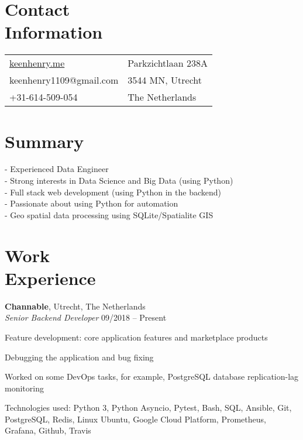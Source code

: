 \documentclass[margin,line]{resume}
\begin{document}
\begin{resume}

    \section{\myheadingstyle Contact \\ Information}
      \begin{tabular}{@{}p{7cm}p{6cm}}
      \url{keenhenry.me}      & Parkzichtlaan 238A \\
      keenhenry1109@gmail.com & 3544 MN, Utrecht \\
      +31-614-509-054        & The Netherlands \\
      \end{tabular}
 
    \section{\myheadingstyle Summary}
      - Experienced Data Engineer \\
      - Strong interests in Data Science and Big Data (using Python) \\
      - Full stack web development (using Python in the backend) \\
      - Passionate about using Python for automation \\
      - Geo spatial data processing using SQLite/Spatialite GIS \\
    \vspace{-5mm}

    \section{\myheadingstyle Work \\ Experience}
    \textbf{Channable}, Utrecht, The Netherlands \\
    \textsl{Senior Backend Developer} \hfill 09/2018 -- Present \vspace{-3mm}\\\vspace{-1mm}%
      \begin{list2}
      \item Feature development: core application features and marketplace products
      \item Debugging the application and bug fixing
      \item Worked on some DevOps tasks, for example, PostgreSQL database replication-lag monitoring
      \item Technologies used: Python 3, Python Asyncio, Pytest, Bash, SQL, Ansible, Git, PostgreSQL, Redis, Linux Ubuntu,
            Google Cloud Platform, Prometheus, Grafana, Github, Travis
      \end{list2}


\end{resume}
\end{document}
